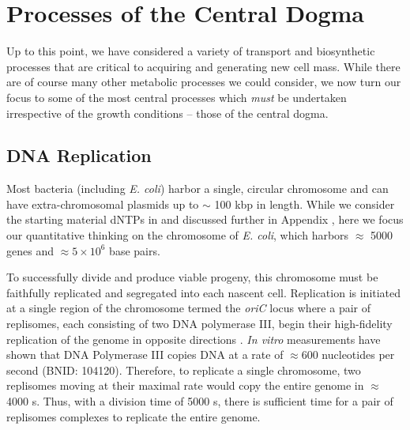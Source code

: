 \section{Processes of the Central Dogma}
Up to this point, we have considered a variety of transport and biosynthetic
processes that are critical to acquiring and generating new cell mass. While
there are of course many other metabolic processes we could consider, we now
turn our focus to some of the most central processes which \textit{must} be
undertaken irrespective of the growth conditions -- those of the central
dogma.

\subsection{DNA Replication}
Most bacteria (including \textit{E. coli}) harbor a single, circular chromosome
and can have extra-chromosomal plasmids up to $\sim$ 100 kbp in length. While
we consider the starting material dNTPs in  and
discussed further in Appendix , here we focus
our quantitative thinking on the chromosome of \textit{E. coli}, which
harbors $\approx$ 5000 genes and $\approx 5\times 10^6$ base pairs.


To successfully divide and produce viable progeny, this chromosome must be
faithfully replicated and segregated into each nascent cell. Replication is
initiated at a single region of the chromosome termed the \textit{oriC} locus
where a pair of replisomes, each consisting of two DNA polymerase III,
begin their high-fidelity replication of the genome in opposite directions
\citep{fijalkowska2012}. \textit{In vitro} measurements have shown that DNA
Polymerase III copies DNA at a rate of $\approx 600$ nucleotides per second
(BNID: 104120). Therefore, to replicate a single chromosome, two replisomes
moving at their maximal rate would copy the entire genome in $\approx$ 4000
s. Thus, with a division time of 5000 s, there is sufficient time for a pair
of replisomes complexes to replicate the entire genome.

